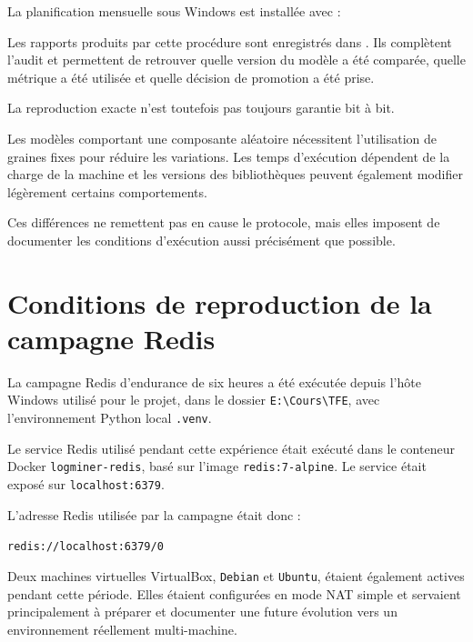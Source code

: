La planification mensuelle sous Windows est installée avec :

\begin{center}
\end{center}

Les rapports produits par cette procédure sont enregistrés dans . Ils complètent l'audit et permettent de retrouver quelle version du modèle a été comparée, quelle métrique a été utilisée et quelle décision de promotion a été prise.

La reproduction exacte n'est toutefois pas toujours garantie bit à bit.

Les modèles comportant une composante aléatoire nécessitent l'utilisation de graines fixes pour réduire les variations. Les temps d'exécution dépendent de la charge de la machine et les versions des bibliothèques peuvent également modifier légèrement certains comportements.

Ces différences ne remettent pas en cause le protocole, mais elles imposent de documenter les conditions d'exécution aussi précisément que possible.

\section{Conditions de reproduction de la campagne Redis}

La campagne Redis d'endurance de six heures a été exécutée depuis l'hôte Windows utilisé pour le projet, dans le dossier \texttt{E:\textbackslash Cours\textbackslash TFE}, avec l'environnement Python local \texttt{.venv}.

Le service Redis utilisé pendant cette expérience était exécuté dans le conteneur Docker \texttt{logminer-redis}, basé sur l'image \texttt{redis:7-alpine}. Le service était exposé sur \texttt{localhost:6379}.

L'adresse Redis utilisée par la campagne était donc :

\begin{center}
\texttt{redis://localhost:6379/0}
\end{center}

Deux machines virtuelles VirtualBox, \texttt{Debian} et \texttt{Ubuntu}, étaient également actives pendant cette période. Elles étaient configurées en mode NAT simple et servaient principalement à préparer et documenter une future évolution vers un environnement réellement multi-machine.

